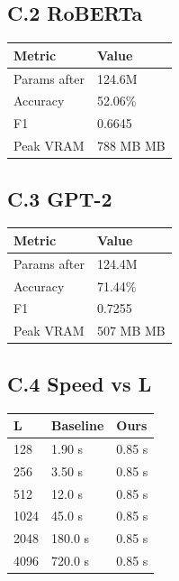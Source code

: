 \subsection{C.2 RoBERTa}

\begin{table}[H]
\centering
\small
\begin{tabular}{ll}
\toprule
\textbf{Metric} & \textbf{Value} \\
\midrule
Params after & 124.6M \\
Accuracy & 52.06\% \\
F1 & 0.6645 \\
Peak VRAM & 788 MB MB \\
\bottomrule
\end{tabular}
\end{table}

\subsection{C.3 GPT-2}

\begin{table}[H]
\centering
\small
\begin{tabular}{ll}
\toprule
\textbf{Metric} & \textbf{Value} \\
\midrule
Params after & 124.4M \\
Accuracy & 71.44\% \\
F1 & 0.7255 \\
Peak VRAM & 507 MB MB \\
\bottomrule
\end{tabular}
\end{table}

\subsection{C.4 Speed vs L}

\begin{table}[H]
\centering
\small
\begin{tabular}{lll}
\toprule
\textbf{L} & \textbf{Baseline} & \textbf{Ours} \\
\midrule
128 & 1.90 s & 0.85 s \\
256 & 3.50 s & 0.85 s \\
512 & 12.0 s & 0.85 s \\
1024 & 45.0 s & 0.85 s \\
2048 & 180.0 s & 0.85 s \\
4096 & 720.0 s & 0.85 s \\
\bottomrule
\end{tabular}
\end{table}

